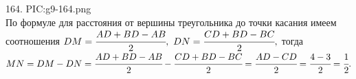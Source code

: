 164. {{PIC:g9-164.png}}\\
По формуле для расстояния от вершины треугольника до точки касания имеем соотношения $DM=\cfrac{AD+BD-AB}{2},\ DN=\cfrac{CD+BD-BC}{2},$ тогда\\
$MN=DM-DN=\cfrac{AD+BD-AB}{2}-\cfrac{CD+BD-BC}{2}=\cfrac{AD-CD}{2}=\cfrac{4-3}{2}=\cfrac{1}{2}.$\\
